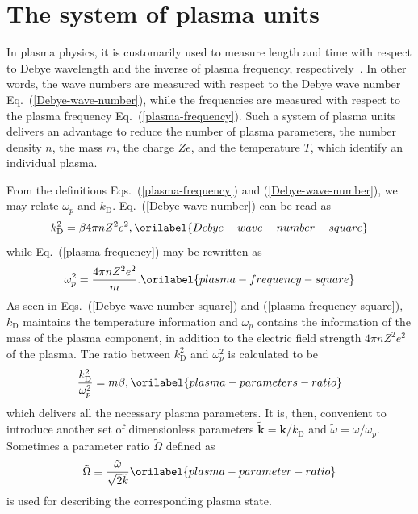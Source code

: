 \documentclass[aps,showkeys,noshowpacs,superscriptaddress,pre,preprint]{revtex4-2}
\let\label\orilabel
\begin{document}
\section{The system of plasma units}
\label{sec:plasma-units}

In plasma physics, it is customarily used to measure length and time with respect to
Debye wavelength and the inverse of plasma frequency, respectively~\cite{Ichimaru1973}.
In other words, the wave numbers are measured with respect to the Debye wave number
Eq.~(\ref{Debye-wave-number}),
while the frequencies are measured with respect to the plasma frequency Eq.~(\ref{plasma-frequency}).
Such a system of plasma units delivers an advantage to reduce the number of plasma parameters, 
the number density $n$, the mass $m$, the charge $Ze$, and the temperature $T$,
which identify an individual plasma.

From the definitions Eqs.~(\ref{plasma-frequency}) and (\ref{Debye-wave-number}),
we may relate $\omega_p$ and $k_\mathrm{D}$.
Eq.~(\ref{Debye-wave-number}) can be read as
\begin{equation}
k_\mathrm{D}^2 = \beta 4\pi n Z^2 e^2 ,
\label{Debye-wave-number-square}
\end{equation}
while Eq.~(\ref{plasma-frequency}) may be rewritten as
\begin{equation}
\omega_p^2 = \frac{4\pi n Z^2 e^2}{m} .
\label{plasma-frequency-square}
\end{equation}
As seen in Eqs.~(\ref{Debye-wave-number-square}) and (\ref{plasma-frequency-square}),
$k_\mathrm{D}$ maintains the temperature information
and $\omega_p$ contains the information of the mass of the plasma component,
in addition to the electric field strength $4\pi n Z^2 e^2$ of the plasma.
The ratio between $k_\mathrm{D}^2$ and $\omega_p^2$ is calculated to be
\begin{equation}
\frac{k_\mathrm{D}^2}{\omega_p^2} = m \beta ,
\label{plasma-parameters-ratio}
\end{equation}
which delivers all the necessary plasma parameters.
It is, then, convenient to introduce another set of dimensionless parameters
$\tilde{\mathbf{k}} = \mathbf{k} / k_\mathrm{D}$
and $\tilde{\omega} = \omega / \omega_p$.
Sometimes a parameter ratio $\tilde{\Omega}$ defined as
\begin{equation}
\tilde{\Omega} \equiv \frac{\tilde{\omega}}{\sqrt{2} \tilde{k}} 
\label{plasma-parameter-ratio}
 \end{equation}
 is used for describing the corresponding plasma state.
 
\end{document}
